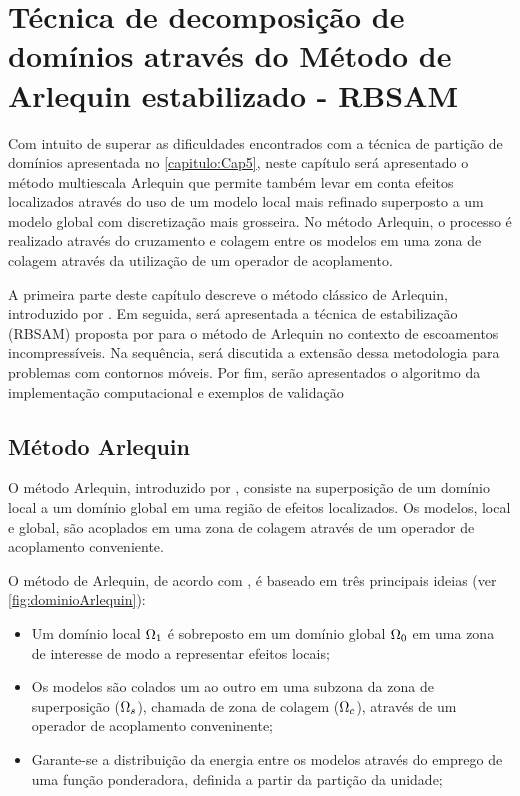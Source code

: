 \chapter[Método de Arlequin estabilizado]{Técnica de decomposição de domínios através do Método de Arlequin estabilizado - RBSAM} \label{capitulo:Cap6}

Com intuito de superar as dificuldades encontrados com a técnica de partição de domínios apresentada no \autoref{capitulo:Cap5}, neste capítulo será apresentado o método multiescala Arlequin que permite também levar em conta efeitos localizados através do uso de um modelo local mais refinado superposto a um modelo global com discretização mais grosseira. No método Arlequin, o processo é realizado através do cruzamento e colagem entre os modelos em uma zona de colagem através da utilização de um operador de acoplamento.

A primeira parte deste capítulo descreve o método clássico de Arlequin, introduzido por . Em seguida, será apresentada a técnica de estabilização (RBSAM) proposta por  para o método de Arlequin no contexto de escoamentos incompressíveis. Na sequência, será discutida a extensão dessa metodologia para problemas com contornos móveis. Por fim, serão apresentados o algoritmo da implementação computacional e exemplos de validação

\section{Método Arlequin}

O método Arlequin, introduzido por , consiste na superposição de um domínio local a um domínio global em uma região de efeitos localizados. Os modelos, local e global, são acoplados em uma zona de colagem através de um operador de acoplamento conveniente.

O  método de Arlequin, de acordo com , é baseado em três principais ideias (ver \autoref{fig:dominioArlequin}):

\begin{itemize}
	\item Um domínio local $\Omega_1$ é sobreposto em um domínio global  $\Omega_0$ em uma zona de interesse de modo a representar efeitos locais;
	\item Os modelos são colados um ao outro em uma subzona da zona de superposição ($\Omega_s$), chamada de zona de colagem ($\Omega_c$), através de um operador de acoplamento conveninente;
	\item  Garante-se a distribuição da energia entre os modelos através do emprego de uma função ponderadora, definida a partir da partição da unidade;
\end{itemize}

